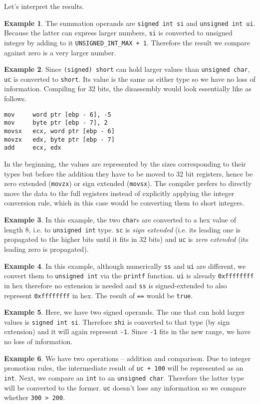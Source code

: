 \documentclass[a4paper]{article}
\begin{document}
Let's interpret the results.

\textbf{Example 1}. The summation operands are \texttt{signed int si} and \texttt{unsigned int ui}. Because the latter can express larger numbers, \texttt{si} is converted to unsigned integer by adding to it \texttt{UNSIGNED\_INT\_MAX + 1}. Therefore the result we compare against zero is a very larger number.

\textbf{Example 2}. Since \texttt{(signed) short} can hold larger values than \texttt{unsigned char}, \texttt{uc} is converted to \texttt{short}. Its value is the same as either type so we have no loss of information. Compiling for 32 bits, the disassembly would look essentially like as follows.
\begin{verbatim}
mov     word ptr [ebp - 6], -5
mov     byte ptr [ebp - 7], 2
movsx   ecx, word ptr [ebp - 6]
movzx   edx, byte ptr [ebp - 7]
add     ecx, edx
\end{verbatim}
In the beginning, the values are represented by the sizes corresponding to their types but before the addition they have to be moved to 32 bit registers, hence be zero extended (\texttt{movzx}) or sign extended (\texttt{movsx}). The compiler prefers to directly move the data to the full registers instead of explicitly applying the integer conversion rule, which in this case would be converting them to short integers.

\textbf{Example 3}. In this example, the two \texttt{char}s are converted to a hex value of length 8, i.e. to \texttt{unsigned int} type. \texttt{sc} is \textit{sign extended} (i.e. its leading one is propagated to the higher bits until it fits in 32 bits) and \texttt{uc} is \textit{zero extended} (its leading zero is propagated).

\textbf{Example 4}. In this example, although numerically \texttt{ss} and \texttt{ui} are different, we convert them to \texttt{unsigned int} via the \texttt{printf} function. \texttt{ui} is already \texttt{0xffffffff} in hex therefore no extension is needed and \texttt{ss} is signed-extended to also represent \texttt{0xffffffff} in hex. The result of \texttt{==} would be \texttt{true}.  

\textbf{Example 5}. Here, we have two signed operands. The one that can hold larger values is \texttt{signed int si}. Therefore \texttt{shi} is converted to that type (by sign extension) and it will again represent \texttt{-1}. Since \texttt{-1} fits in the new range, we have no loss of information. 

\textbf{Example 6}. We have two operations -- addition and comparison. Due to integer promotion rules, the intermediate result of \texttt{uc + 100} will be represented as an \texttt{int}. Next, we compare an \texttt{int} to an \texttt{unsigned char}. Therefore the latter type will be converted to the former. \texttt{uc} doesn't lose any information so we compare whether \texttt{300 > 200}.
\end{document}
